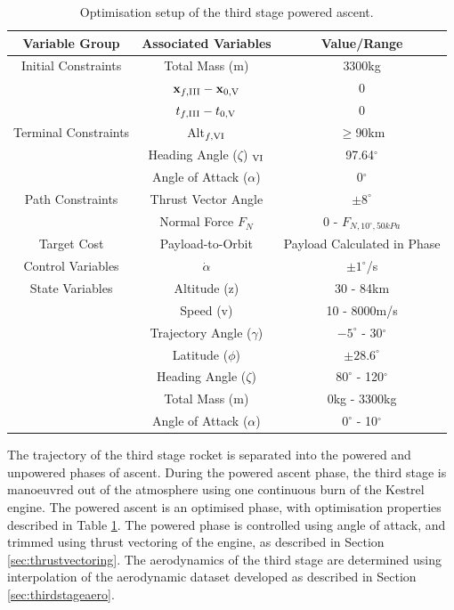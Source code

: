 \begin{table}[ht]
	\centering
	\begin{tabular}{|c|c|c|}
		\hline \textbf{Variable Group}  & \textbf{Associated Variables} & \textbf{Value/Range}\\	\hline Initial Constraints  & Total Mass (m) & 3300kg\\ 
		& $\textbf{x}_{f,\textrm{\rom{3}}} - \textbf{x}_{0,\textrm{\rom{5}}}$ & 0\\ & $t_{f,\textrm{\rom{3}}} - t_{0,\textrm{\rom{5}}}$ & 0\\
		\hline Terminal Constraints & Alt$_{f,\textrm{\rom{6}}}$ & $\geq$90km\\ & Heading Angle ($\zeta$) $_{\textrm{\rom{6}}}$ & 97.64$^\circ$\\  & Angle of Attack ($\alpha$) & 0$^\circ$\\
		\hline Path Constraints  & Thrust Vector Angle & $\pm8^\circ$\\ & Normal Force $F_N$ & 0 - $F_{N, 10^\circ, 50kPa}$ \\
		\hline Target Cost & Payload-to-Orbit & Payload Calculated in Phase \rom{7}\\ 
		\hline Control Variables & $\dot{\alpha}$ & $\pm1^\circ$/s\\ 
		\hline State Variables & Altitude (z) & 30 - 84km\\ & Speed (v)& 10 - 8000m/s\\ & Trajectory Angle ($\gamma$)& $-5^\circ$ - 30$^\circ$ \\   & Latitude ($\phi$) &$\pm28.6^\circ$ \\   & Heading Angle ($\zeta$)& $80^\circ$ - 120$^\circ$\\  & Total Mass (m)& 0kg - 3300kg \\  & Angle of Attack ($\alpha$)&  $0^\circ$ - 10$^\circ$\\ 
		\hline 
	\end{tabular} 
	\caption{Optimisation setup of the third stage powered ascent.}
	\label{tab:thirdstageopt}
\end{table}
\noindent
The trajectory of the third stage rocket is separated into the powered and unpowered phases of ascent.
During the powered ascent phase, the third stage is manoeuvred out of the atmosphere using one continuous burn of the Kestrel engine. The powered ascent is an optimised phase, with optimisation properties described in Table \ref{tab:thirdstageopt}. 
 The powered phase is controlled using angle of attack, and trimmed using thrust vectoring of the engine, as described in Section \ref{sec:thrustvectoring}. The aerodynamics of the third stage are determined using interpolation of the aerodynamic dataset developed as described in Section \ref{sec:thirdstageaero}.

